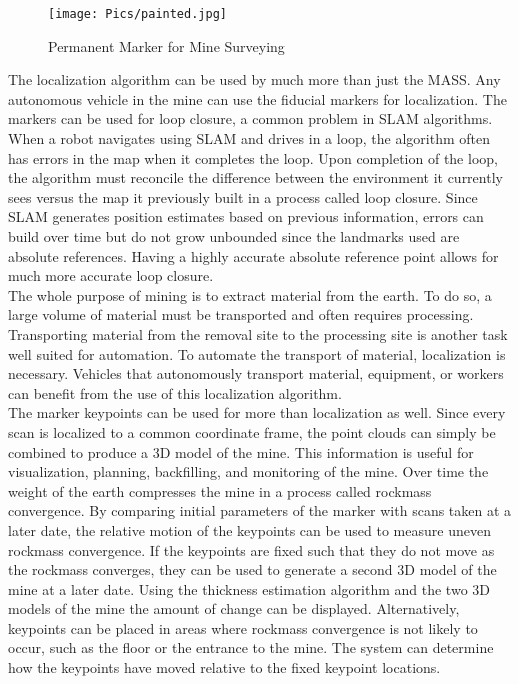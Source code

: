 \begin{figure}
    \centering
\texttt{[image: Pics/painted.jpg]} 
    \caption{Permanent Marker for Mine Surveying}
    \label{fig:minepaint}
\end{figure}

The localization algorithm can be used by much more than just the MASS. Any autonomous vehicle in the mine can use the fiducial markers for localization. The markers can be used for loop closure, a common problem in SLAM algorithms. When a robot navigates using SLAM and drives in a loop, the algorithm often has errors in the map when it completes the loop. Upon completion of the loop, the algorithm must reconcile the difference between the environment it currently sees versus the map it previously built in a process called loop closure. Since SLAM generates position estimates based on previous information, errors can build over time but do not grow unbounded since the landmarks used are absolute references. Having a highly accurate absolute reference point allows for much more accurate loop closure.\\

The whole purpose of mining is to extract material from the earth. To do so, a large volume of material must be transported and often requires processing. Transporting material from the removal site to the processing site is another task well suited for automation. To automate the transport of material, localization is necessary. Vehicles that autonomously transport material, equipment, or workers can benefit from the use of this localization algorithm.\\

The marker keypoints can be used for more than localization as well. Since every scan is localized to a common coordinate frame, the point clouds can simply be combined to produce a 3D model of the mine. This information is useful for visualization, planning, backfilling, and monitoring of the mine. Over time the weight of the earth compresses the mine in a process called rockmass convergence. By comparing initial parameters of the marker with scans taken at a later date, the relative motion of the keypoints can be used to measure uneven rockmass convergence. If the keypoints are fixed such that they do not move as the rockmass converges, they can be used to generate a second 3D model of the mine at a later date. Using the thickness estimation algorithm and the two 3D models of the mine the amount of change can be displayed. Alternatively, keypoints can be placed in areas where rockmass convergence is not likely to occur, such as the floor or the entrance to the mine. The system can determine how the keypoints have moved relative to the fixed keypoint locations.\\

